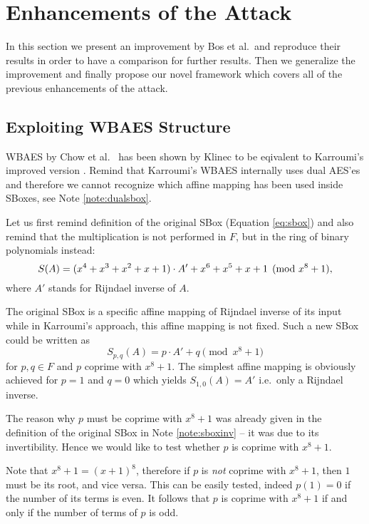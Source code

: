 \section{Enhancements of the Attack}   %
\label{sec:enhancements}

In this section we present an improvement by Bos et al.\ and reproduce their results in order to have a comparison for further results. Then we generalize the improvement and finally propose our novel framework which covers all of the previous enhancements of the attack.



\subsection{Exploiting WBAES Structure}

WBAES by Chow et al.\ \cite{chow2002aes} has been shown by Klinec \cite{klinec2013white} to be eqivalent to Karroumi's improved version \cite{karroumi2011protecting}. Remind that Karroumi's WBAES internally uses dual AES'es and therefore we cannot recognize which affine mapping has been used inside SBoxes, see Note \ref{note:dualsbox}.

Let us first remind definition of the original SBox (Equation \ref{eq:sbox}) and also remind that the multiplication is not performed in $F$, but in the ring of binary polynomials instead:
\[
	S(A) = (x^4 + x^3 + x^2 + x + 1) \cdot A' + x^6 + x^5 + x + 1 \pmod{x^8+1} ,
\]
where $A'$ stands for Rijndael inverse of $A$.

The original SBox is a specific affine mapping of Rijndael inverse of its input while in Karroumi's approach, this affine mapping is not fixed. Such a new SBox could be written as   %
\begin{equation}
\label{eq:spq}
	S_{p,q}(A) = p\cdot A' + q \pmod{x^8+1}
\end{equation}
for $p,q\in F$ and $p$ coprime with $x^8+1$. The simplest affine mapping is obviously achieved for $p=1$ and $q=0$ which yields $S_{1,0}(A) = A'$ i.e.\ only a Rijndael inverse.

\begin{remark}
\label{rem:coprime}
	The reason why $p$ must be coprime with $x^8+1$ was already given in the definition of the original SBox in Note \ref{note:sboxinv} -- it was due to its invertibility. Hence we would like to test whether $p$ is coprime with $x^8+1$.
	
	Note that $x^8+1 = (x+1)^8$, therefore if $p$ is {\em not} coprime with $x^8+1$, then $1$ must be its root, and vice versa. This can be easily tested, indeed $p(1) = 0$ if the number of its terms is even. It follows that $p$ is coprime with $x^8+1$ if and only if the number of terms of $p$ is odd.
\end{remark}


